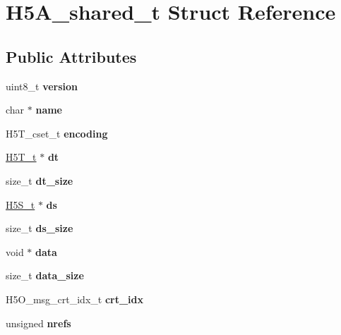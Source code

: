 \hypertarget{struct_h5_a__shared__t}{}\section{H5\+A\+\_\+shared\+\_\+t Struct Reference}
\label{struct_h5_a__shared__t}
\subsection*{Public Attributes}
\begin{DoxyCompactItemize}
\item 
\mbox{\label{struct_h5_a__shared__t_ae646cd9ea3f08d54a756ebec12d404b8}} 
uint8\+\_\+t {\bfseries version}
\item 
\mbox{\label{struct_h5_a__shared__t_a4c3660ecafa145d346fb547ff4bb5407}} 
char $\ast$ {\bfseries name}
\item 
\mbox{\label{struct_h5_a__shared__t_a8614f21cdf6605af8362362ac4c95e2e}} 
H5\+T\+\_\+cset\+\_\+t {\bfseries encoding}
\item 
\mbox{\label{struct_h5_a__shared__t_a5925723f170ce6c1a029de892faee008}} 
\hyperlink{struct_h5_t__t}{H5\+T\+\_\+t} $\ast$ {\bfseries dt}
\item 
\mbox{\label{struct_h5_a__shared__t_a60ef6a0c35daf42abed7b6fc2d0143ae}} 
size\+\_\+t {\bfseries dt\+\_\+size}
\item 
\mbox{\label{struct_h5_a__shared__t_aaa38737992562078341cf73db2c7cda1}} 
\hyperlink{struct_h5_s__t}{H5\+S\+\_\+t} $\ast$ {\bfseries ds}
\item 
\mbox{\label{struct_h5_a__shared__t_ae2052a0a6c91f899b356e3cd298c3bab}} 
size\+\_\+t {\bfseries ds\+\_\+size}
\item 
\mbox{\label{struct_h5_a__shared__t_a9c0963e3b1ffd17b892b824b78b81cd3}} 
void $\ast$ {\bfseries data}
\item 
\mbox{\label{struct_h5_a__shared__t_ada7ed63cf6116ba894ce3a1f0f10d149}} 
size\+\_\+t {\bfseries data\+\_\+size}
\item 
\mbox{\label{struct_h5_a__shared__t_a37e12ac3da07d1e8e18c3607e581f945}} 
H5\+O\+\_\+msg\+\_\+crt\+\_\+idx\+\_\+t {\bfseries crt\+\_\+idx}
\item 
\mbox{\label{struct_h5_a__shared__t_a526c95e9777940ff1ab78a4e425a8eb2}} 
unsigned {\bfseries nrefs}
\end{DoxyCompactItemize}


